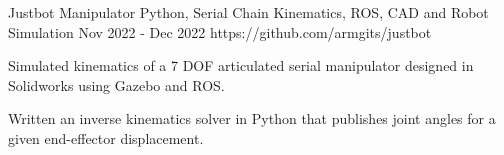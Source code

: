 \begin{project}
  {Justbot Manipulator}
  {Python, Serial Chain Kinematics, ROS, CAD and Robot Simulation}
  {Nov 2022 - Dec 2022}
  {https://github.com/armgits/justbot}

  \item Simulated kinematics of a 7 DOF articulated serial manipulator designed in Solidworks
        using Gazebo and ROS.

  \item Written an inverse kinematics solver in Python that publishes joint
        angles for a given end-effector displacement.

\end{project}
